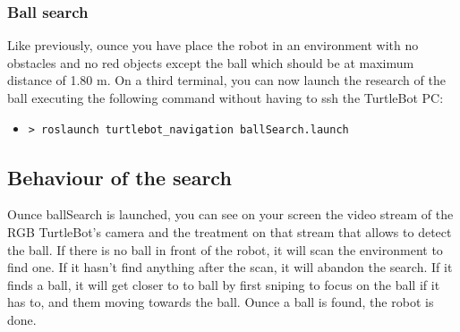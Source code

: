 \documentclass[10pt,a4paper]{article}
\begin{document}
\subsubsection{Ball search}

Like previously, ounce you have place the robot in an environment with no obstacles and no red objects except the ball which should be at maximum distance of 1.80 m. On a third terminal, you can now launch the research of the ball executing the following command without having to ssh the TurtleBot PC:

\begin{itemize}
\item[]  \begin{verbatim}> roslaunch turtlebot_navigation ballSearch.launch \end{verbatim}
\end{itemize}

\subsection{Behaviour of the search}

Ounce ballSearch is launched, you can see on your screen the video stream of the RGB TurtleBot's camera and the treatment on that stream that allows to detect the ball. If there is no ball in front of the robot, it will scan the environment to find one. If it hasn't find anything after the scan, it will abandon the search. If it finds a ball, it will get closer to to ball by first sniping to focus on the ball if it has to, and them moving towards the ball. Ounce a ball is found, the robot is done.
\end{document}
